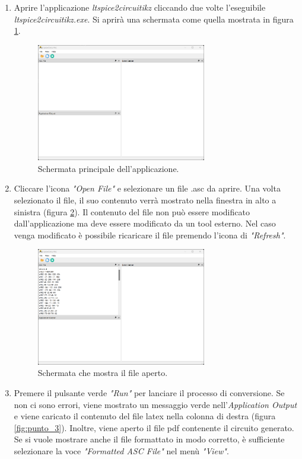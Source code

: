 	\begin{enumerate}
	\item Aprire l'applicazione \textit{ltspice2circuitikz} cliccando due volte l'eseguibile \textit{ltspice2circuitikz.exe}. Si aprirà una schermata come quella mostrata in figura \ref{fig:punto_1}.
	\begin{figure}[h!]
		\centering
		\includegraphics[width=0.7\textwidth]{./ImageFiles/mainview.png}
		\caption{Schermata principale dell'applicazione.}
		\label{fig:punto_1}
	\end{figure}
	\item Cliccare l'icona \textit{"Open File"} e selezionare un file .asc da aprire. Una volta selezionato il file, il suo contenuto verrà mostrato nella finestra in alto a sinistra (figura \ref{fig:punto_2}). Il contenuto del file non può essere modificato dall'applicazione ma deve essere modificato da un tool esterno. Nel caso venga modificato è possibile ricaricare il file premendo l'icona di \textit{"Refresh"}.
	\begin{figure}[h!]
		\centering
		\includegraphics[width=0.7\textwidth]{./ImageFiles/file aperto.png}
		\caption{Schermata che mostra il file aperto.}
		\label{fig:punto_2}
	\end{figure}
	\newpage
	\item Premere il pulsante verde \textit{"Run"} per lanciare il processo di conversione. Se non ci sono errori, viene mostrato un messaggio verde nell'\textit{Application Output} e viene caricato il contenuto del file latex nella colonna di destra (figura \ref{fig:punto_3}). Inoltre, viene aperto il file pdf contenente il circuito generato. Se si vuole mostrare anche il file formattato in modo corretto, è sufficiente selezionare la voce \textit{"Formatted ASC File"} nel menù \textit{"View"}.

\end{enumerate}
